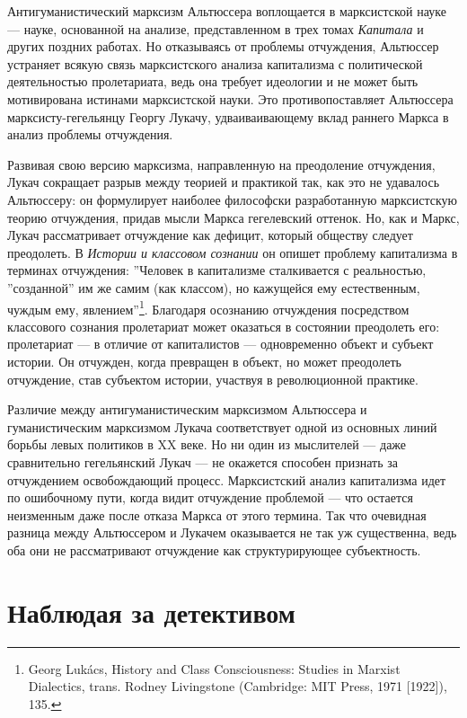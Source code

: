 \documentclass[12pt]{book}
\begin{document}
Антигуманистический марксизм Альтюссера воплощается в марксистской науке --- науке, основанной на анализе, представленном в трех томах \textit{Капитала} и других поздних работах. Но отказываясь от проблемы отчуждения, Альтюссер устраняет всякую связь марксистского анализа капитализма с политической деятельностью пролетариата, ведь она требует идеологии и не может быть мотивирована истинами марксистской науки. Это противопоставляет Альтюссера марксисту-гегельянцу Георгу Лукачу, удваиваивающему вклад раннего Маркса в анализ проблемы отчуждения.

Развивая свою версию марксизма, направленную на преодоление отчуждения, Лукач сокращает разрыв между теорией и практикой так, как это не удавалось Альтюссеру: он формулирует наиболее философски разработанную марксистскую теорию отчуждения, придав мысли Маркса гегелевский оттенок. Но, как и Маркс, Лукач рассматривает отчуждение как дефицит, который обществу следует преодолеть. В \textit{Истории и классовом сознании} он опишет проблему капитализма в терминах отчуждения: ''Человек в капитализме сталкивается с реальностью, ''созданной'' им же самим (как классом), но кажущейся ему естественным, чуждым ему, явлением''\footnote{Georg Lukács, History and Class Consciousness: Studies in Marxist Dialectics, trans. Rodney Livingstone (Cambridge: MIT Press, 1971 [1922]), 135.}. Благодаря осознанию отчуждения посредством классового сознания пролетариат может оказаться в состоянии преодолеть его: пролетариат --- в отличие от капиталистов --- одновременно объект и субъект истории. Он отчужден, когда превращен в объект, но может преодолеть отчуждение, став субъектом истории, участвуя в революционной практике.

Различие между антигуманистическим марксизмом Альтюссера и гуманистическим марксизмом Лукача соответствует одной из основных линий борьбы левых политиков в XX веке. Но ни один из мыслителей --- даже сравнительно гегельянский Лукач --- не окажется способен признать за отчуждением освобождающий процесс. Марксистский анализ капитализма идет по ошибочному пути, когда видит отчуждение проблемой --- что остается неизменным даже после отказа Маркса от этого термина. Так что очевидная разница между Альтюссером и Лукачем оказывается не так уж существенна, ведь оба они не рассматривают отчуждение как структурирующее субъектность.

\section{Наблюдая за детективом}
\end{document}
